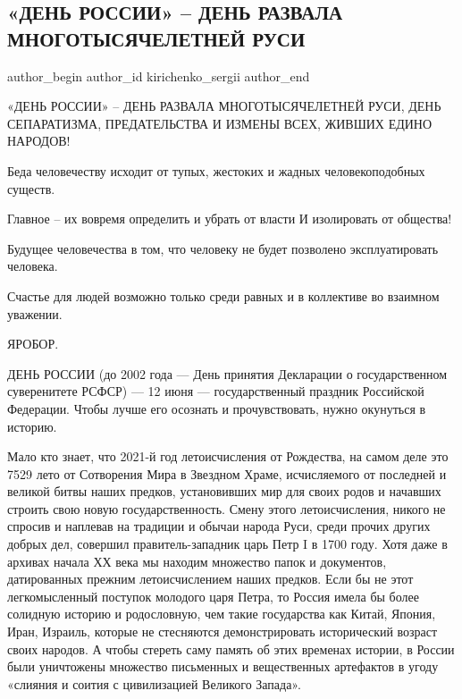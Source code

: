  
 
 
 
 
 
\subsection{«ДЕНЬ РОССИИ» – ДЕНЬ РАЗВАЛА МНОГОТЫСЯЧЕЛЕТНЕЙ РУСИ}
\label{sec:12_06_2021.fb.kirichenko_sergii.1.den_rossii_razval_rusi}
\ifcmt
 author_begin
   author_id kirichenko_sergii
 author_end
\fi

«ДЕНЬ РОССИИ» – ДЕНЬ РАЗВАЛА МНОГОТЫСЯЧЕЛЕТНЕЙ РУСИ, ДЕНЬ СЕПАРАТИЗМА, ПРЕДАТЕЛЬСТВА И ИЗМЕНЫ ВСЕХ, ЖИВШИХ ЕДИНО НАРОДОВ!

Беда человечеству исходит от тупых, жестоких и жадных человекоподобных существ.

Главное – их вовремя определить и убрать от власти И изолировать от общества!

Будущее человечества в том, что человеку не будет позволено эксплуатировать
человека.

Счастье для людей возможно только среди равных и в коллективе во взаимном
уважении.

ЯРОБОР.

ДЕНЬ РОССИИ (до 2002 года — День принятия Декларации о государственном
суверенитете РСФСР) — 12 июня — государственный праздник Российской Федерации.
Чтобы лучше его осознать и прочувствовать, нужно окунуться в историю.

Мало кто знает, что 2021-й год летоисчисления от Рождества, на самом деле это
7529 лето от Сотворения Мира в Звездном Храме, исчисляемого от последней и
великой битвы наших предков, установивших мир для своих родов и начавших
строить свою новую государственность. Смену этого летоисчисления, никого не
спросив и наплевав на традиции и обычаи народа Руси, среди прочих других добрых
дел, совершил правитель-западник царь Петр I в 1700 году. Хотя даже в архивах
начала ХХ века мы находим множество папок и документов, датированных прежним
летоисчислением наших предков. Если бы не этот легкомысленный поступок молодого
царя Петра, то Россия имела бы более солидную историю и родословную, чем такие
государства как Китай, Япония, Иран, Израиль, которые не стесняются
демонстрировать исторический возраст своих народов. А чтобы стереть саму память
об этих временах истории, в России были уничтожены множество письменных и
вещественных артефактов в угоду «слияния и соития с цивилизацией Великого
Запада».

